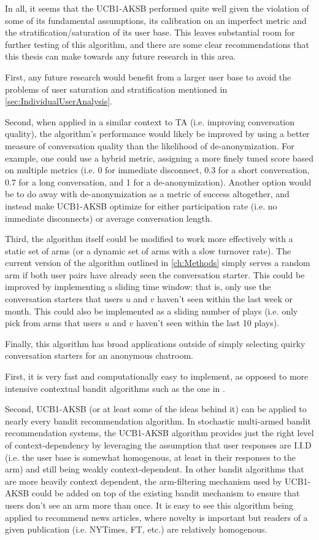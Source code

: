 In all, it seems that the UCB1-AKSB performed quite well given the violation of some of its fundamental assumptions, its calibration on an imperfect metric and the stratification/saturation of its user base. This leaves substantial room for further testing of this algorithm, and there are some clear recommendations that this thesis can make towards any future research in this area. 

First, any future research would benefit from a larger user base to avoid the problems of user saturation and stratification mentioned in \autoref{sec:IndividualUserAnalysis}. 

Second, when applied in a similar context to TA (i.e. improving conversation quality), the algorithm's performance would likely be improved by using a better measure of conversation quality than the likelihood of de-anonymization. For example, one could use a hybrid metric, assigning a more finely tuned score based on multiple metrics (i.e. 0 for immediate disconnect, 0.3 for a short conversation, 0.7 for a long conversation, and 1 for a de-anonymization). Another option would be to do away with de-anonymization as a metric of success altogether, and instead make UCB1-AKSB optimize for either participation rate (i.e. no immediate disconnects) or average conversation length. 

Third, the algorithm itself could be modified to work more effectively with a static set of arms (or a dynamic set of arms with a slow turnover rate). The current version of the algorithm outlined in \autoref{ch:Methods} simply serves a random arm if both user pairs have already seen the conversation starter. This could be improved by implementing a sliding time window: that is, only use the conversation starters that users $u$ and $v$ haven't seen within the last week or month. This could also be implemented as a sliding number of plays (i.e. only pick from arms that users $u$ and $v$ haven't seen within the last 10 plays).

Finally, this algorithm has broad applications outside of simply selecting quirky conversation starters for an anonymous chatroom. 

First, it is very fast and computationally easy to implement, as opposed to more intensive contextual bandit algorithms such as the one in \citet{chu10}. 

Second, UCB1-AKSB (or at least some of the ideas behind it) can be applied to nearly every bandit recommendation algorithm. In stochastic multi-armed bandit recommendation systems, the UCB1-AKSB algorithm provides just the right level of context-dependency by leveraging the assumption that user responses are I.I.D (i.e. the user base is somewhat homogenous, at least in their responses to the arm) and still being weakly context-dependent. In other bandit algorithms that are more heavily context dependent, the arm-filtering mechanism used by UCB1-AKSB could be added on top of the existing bandit mechanism to ensure that users don't see an arm more than once. It is easy to see this algorithm being applied to recommend news articles, where novelty is important but readers of a given publication (i.e. NYTimes, FT, etc.) are relatively homogenous.
